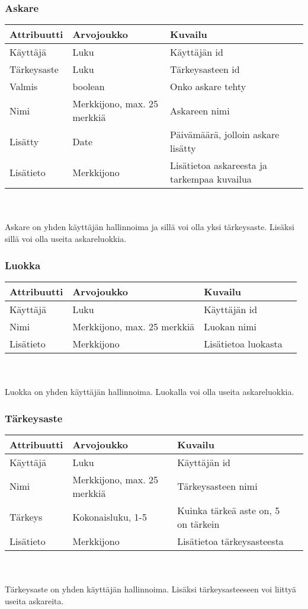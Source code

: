 \documentclass{report}
\begin{document}
\subsubsection*{Askare}
\begin{tabular}{ | l | l | l | p{7.5cm} |} \hline
\textbf{Attribuutti} & \textbf{Arvojoukko} & \textbf{Kuvailu} \\ \hline
Käyttäjä & Luku & Käyttäjän id \\ \hline
Tärkeysaste & Luku & Tärkeysasteen id \\ \hline
Valmis & boolean & Onko askare tehty \\ \hline
Nimi & Merkkijono, max. 25 merkkiä & Askareen nimi \\ \hline
Lisätty & Date & Päivämäärä, jolloin askare lisätty \\ \hline
Lisätieto & Merkkijono & Lisätietoa askareesta ja tarkempaa kuvailua \\ \hline
\end{tabular}
\\ \\ Askare on yhden käyttäjän hallinnoima ja sillä voi olla yksi tärkeysaste. Lisäksi sillä voi olla useita askareluokkia. 

\subsubsection*{Luokka}
\begin{tabular}{ | l | l | l | p{7.5cm} |} \hline
\textbf{Attribuutti} & \textbf{Arvojoukko} & \textbf{Kuvailu} \\ \hline
Käyttäjä & Luku & Käyttäjän id \\ \hline
Nimi & Merkkijono, max. 25 merkkiä & Luokan nimi \\ \hline
Lisätieto & Merkkijono & Lisätietoa luokasta \\ \hline
\end{tabular}
\\ \\ Luokka on yhden käyttäjän hallinnoima. Luokalla voi olla useita askareluokkia.
\subsubsection*{Tärkeysaste}
\begin{tabular}{ | l | l | l | p{7.5cm} |} \hline
\textbf{Attribuutti} & \textbf{Arvojoukko} & \textbf{Kuvailu} \\ \hline
Käyttäjä & Luku & Käyttäjän id \\ \hline
Nimi & Merkkijono, max. 25 merkkiä & Tärkeysasteen nimi \\ \hline
Tärkeys & Kokonaisluku, 1-5 & Kuinka tärkeä aste on, 5 on tärkein \\ \hline
Lisätieto & Merkkijono & Lisätietoa tärkeysasteesta \\ \hline
\end{tabular}
\\ \\ Tärkeysaste on yhden käyttäjän hallinnoima. Lisäksi tärkeysasteeseen voi liittyä useita askareita.
\end{document}
